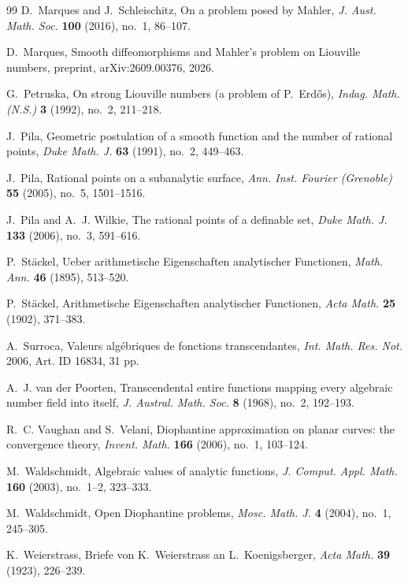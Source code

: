 \documentclass[11pt]{amsart}
\numberwithin{equation}{section}
\theoremstyle{definition}
\theoremstyle{remark}
\begin{document}
\begin{thebibliography}{99}
D.~Marques and J.~Schleischitz,
On a problem posed by Mahler,
\emph{J. Aust. Math. Soc.} \textbf{100} (2016), no.~1, 86--107.

D.~Marques,
Smooth diffeomorphisms and Mahler's problem on Liouville numbers,
preprint, arXiv:2609.00376, 2026.

G.~Petruska,
On strong Liouville numbers (a problem of P.~Erd\H{o}s),
\emph{Indag. Math. (N.S.)} \textbf{3} (1992), no.~2, 211--218.

J.~Pila,
Geometric postulation of a smooth function and the number of rational points,
\emph{Duke Math. J.} \textbf{63} (1991), no.~2, 449--463.

J.~Pila,
Rational points on a subanalytic surface,
\emph{Ann. Inst. Fourier (Grenoble)} \textbf{55} (2005), no.~5, 1501--1516.

J.~Pila and A.~J. Wilkie,
The rational points of a definable set,
\emph{Duke Math. J.} \textbf{133} (2006), no.~3, 591--616.


P.~St\"ackel,
Ueber arithmetische Eigenschaften analytischer Functionen,
\emph{Math. Ann.} \textbf{46} (1895), 513--520.

P.~St\"ackel,
Arithmetische Eigenschaften analytischer Functionen,
\emph{Acta Math.} \textbf{25} (1902), 371--383.

A.~Surroca,
Valeurs alg\'ebriques de fonctions transcendantes,
\emph{Int. Math. Res. Not.} 2006, Art. ID 16834, 31 pp.

A.~J. van der Poorten,
Transcendental entire functions mapping every algebraic number field into itself,
\emph{J. Austral. Math. Soc.} \textbf{8} (1968), no.~2, 192--193.

R.~C. Vaughan and S.~Velani,
Diophantine approximation on planar curves: the convergence theory,
\emph{Invent. Math.} \textbf{166} (2006), no.~1, 103--124.

M.~Waldschmidt,
Algebraic values of analytic functions,
\emph{J. Comput. Appl. Math.} \textbf{160} (2003), no.~1--2, 323--333.

M.~Waldschmidt,
Open Diophantine problems,
\emph{Mosc. Math. J.} \textbf{4} (2004), no.~1, 245--305.

K.~Weierstrass,
Briefe von K.~Weierstrass an L.~Koenigsberger,
\emph{Acta Math.} \textbf{39} (1923), 226--239.

\end{thebibliography}
\end{document}
